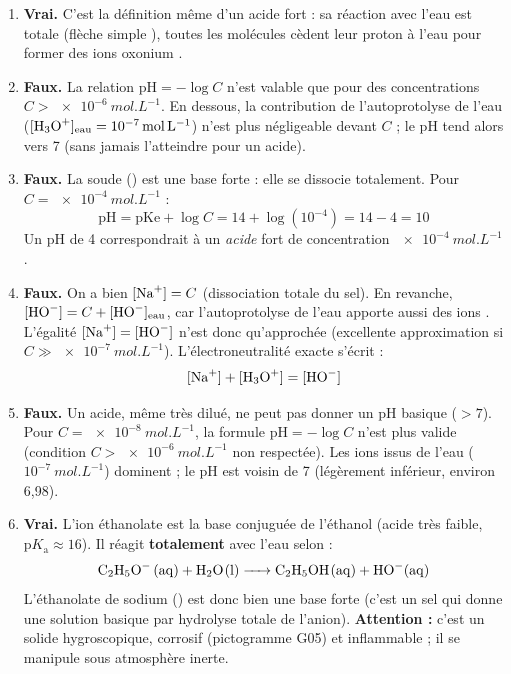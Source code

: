 \documentclass[11pt]{article}
\begin{document}
\begin{corrige}
\begin{enumerate}
    \item \textbf{Vrai.} C'est la définition même d'un acide fort : sa réaction avec l'eau est totale (flèche simple \ce{->}), toutes les molécules cèdent leur proton à l'eau pour former des ions oxonium .

    \item \textbf{Faux.} La relation $\mathrm{pH} = -\log C$ n'est valable que pour des concentrations $C > \SI{e-6}{mol.L^{-1}}$. En dessous, la contribution de l'autoprotolyse de l'eau ($[\ce{H3O+}]_{\text{eau}} = \SI{e-7}{mol.L^{-1}}$) n'est plus négligeable devant $C$ ; le pH tend alors vers 7 (sans jamais l'atteindre pour un acide).

    \item \textbf{Faux.} La soude () est une base forte : elle se dissocie totalement. Pour $C = \SI{e-4}{mol.L^{-1}}$ :
    \[ \mathrm{pH} = \mathrm{pKe} + \log C = 14 + \log(10^{-4}) = 14 - 4 = 10 \]
    Un pH de 4 correspondrait à un \emph{acide} fort de concentration $\SI{e-4}{mol.L^{-1}}$.

    \item \textbf{Faux.} On a bien $[\ce{Na+}] = C$ (dissociation totale du sel). En revanche, $[\ce{HO-}] = C + [\ce{HO-}]_{\text{eau}}$, car l'autoprotolyse de l'eau apporte aussi des ions . L'égalité $[\ce{Na+}] = [\ce{HO-}]$ n'est donc qu'approchée (excellente approximation si $C \gg \SI{e-7}{mol.L^{-1}}$). L'électroneutralité exacte s'écrit :
    \[ [\ce{Na+}] + [\ce{H3O+}] = [\ce{HO-}] \]

    \item \textbf{Faux.} Un acide, même très dilué, ne peut pas donner un pH basique ($> 7$). Pour $C = \SI{e-8}{mol.L^{-1}}$, la formule $\mathrm{pH} = -\log C$ n'est plus valide (condition $C > \SI{e-6}{mol.L^{-1}}$ non respectée). Les ions  issus de l'eau ($10^{-7}\ \si{mol.L^{-1}}$) dominent ; le pH est voisin de 7 (légèrement inférieur, environ 6,98).

    \item \textbf{Vrai.} L'ion éthanolate  est la base conjuguée de l'éthanol (acide très faible, $\mathrm{p}K_\text{a} \approx 16$). Il réagit \textbf{totalement} avec l'eau selon :
    \[ \ce{C2H5O- (aq) + H2O(l) -> C2H5OH(aq) + HO-(aq)} \]
    L'éthanolate de sodium () est donc bien une base forte (c'est un sel qui donne une solution basique par hydrolyse totale de l'anion).
    \textbf{Attention :} c'est un solide hygroscopique, corrosif (pictogramme G05) et inflammable ; il se manipule sous atmosphère inerte.
\end{enumerate}
\end{corrige}
\end{document}

